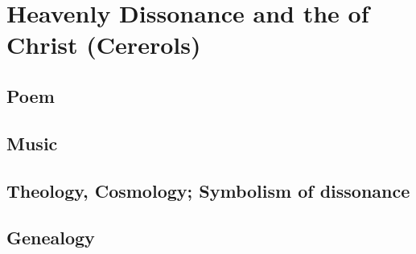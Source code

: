 
\section{Heavenly Dissonance and the  of Christ
(Cererols)}

\subsection{Poem}

\subsection{Music}

\subsection{Theology, Cosmology; Symbolism of dissonance}

\subsection{Genealogy}



